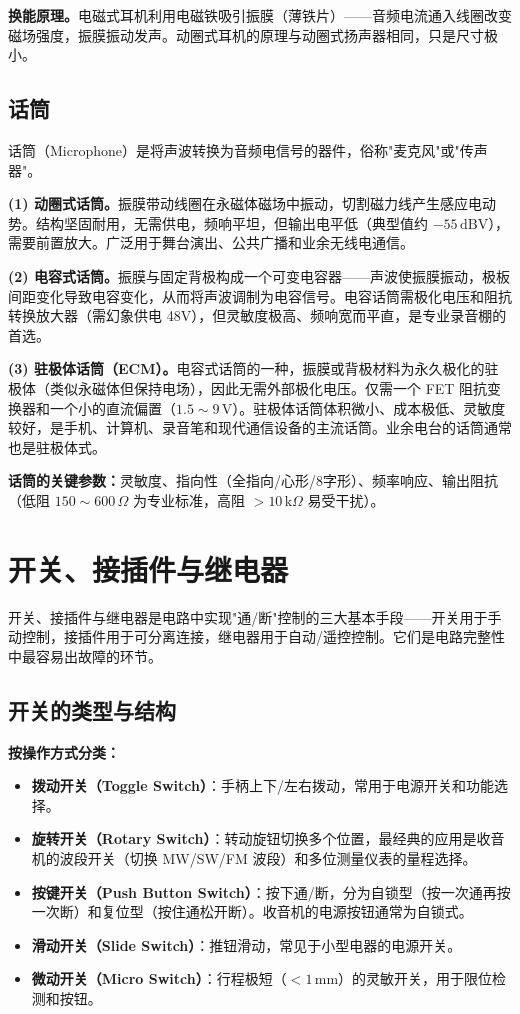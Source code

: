 \documentclass[12pt,UTF8]{ctexbook}
\begin{document}
\textbf{换能原理。}电磁式耳机利用电磁铁吸引振膜（薄铁片）——音频电流通入线圈改变磁场强度，振膜振动发声。动圈式耳机的原理与动圈式扬声器相同，只是尺寸极小。

\subsection{话筒}

话筒（Microphone）是将声波转换为音频电信号的器件，俗称"麦克风"或"传声器"。

\textbf{(1) 动圈式话筒。}振膜带动线圈在永磁体磁场中振动，切割磁力线产生感应电动势。结构坚固耐用，无需供电，频响平坦，但输出电平低（典型值约 $-55\,\mathrm{dBV}$），需要前置放大。广泛用于舞台演出、公共广播和业余无线电通信。

\textbf{(2) 电容式话筒。}振膜与固定背极构成一个可变电容器——声波使振膜振动，极板间距变化导致电容变化，从而将声波调制为电容信号。电容话筒需极化电压和阻抗转换放大器（需幻象供电 48V），但灵敏度极高、频响宽而平直，是专业录音棚的首选。

\textbf{(3) 驻极体话筒（ECM）。}电容式话筒的一种，振膜或背极材料为永久极化的驻极体（类似永磁体但保持电场），因此无需外部极化电压。仅需一个 FET 阻抗变换器和一个小的直流偏置（$1.5\sim9\,\mathrm{V}$）。驻极体话筒体积微小、成本极低、灵敏度较好，是手机、计算机、录音笔和现代通信设备的主流话筒。业余电台的话筒通常也是驻极体式。

\textbf{话筒的关键参数：}灵敏度、指向性（全指向/心形/8字形）、频率响应、输出阻抗（低阻 $150\sim600\,\Omega$ 为专业标准，高阻 $>10\,\mathrm{k}\Omega$ 易受干扰）。

\section{开关、接插件与继电器}
\label{sec:switches_connectors}

开关、接插件与继电器是电路中实现"通/断"控制的三大基本手段——开关用于手动控制，接插件用于可分离连接，继电器用于自动/遥控控制。它们是电路完整性中最容易出故障的环节。

\subsection{开关的类型与结构}

\textbf{按操作方式分类：}
\begin{itemize}
  \item \textbf{拨动开关（Toggle Switch）}：手柄上下/左右拨动，常用于电源开关和功能选择。
  \item \textbf{旋转开关（Rotary Switch）}：转动旋钮切换多个位置，最经典的应用是收音机的波段开关（切换 MW/SW/FM 波段）和多位测量仪表的量程选择。
  \item \textbf{按键开关（Push Button Switch）}：按下通/断，分为自锁型（按一次通再按一次断）和复位型（按住通松开断）。收音机的电源按钮通常为自锁式。
  \item \textbf{滑动开关（Slide Switch）}：推钮滑动，常见于小型电器的电源开关。
  \item \textbf{微动开关（Micro Switch）}：行程极短（$<1\,\mathrm{mm}$）的灵敏开关，用于限位检测和按钮。
\end{itemize}
\end{document}
